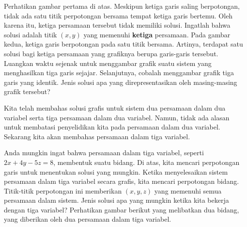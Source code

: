 \begin{center}
\par{}\label{fig:systemsofequationsGeometry-tikz03}%

\end{center}

Perhatikan gambar pertama di atas. Meskipun ketiga garis saling berpotongan, tidak ada satu titik perpotongan bersama
tempat ketiga garis bertemu. Oleh karena itu, ketiga persamaan tersebut tidak memiliki solusi. Ingatlah bahwa solusi adalah titik $\left( x, y \right)$
yang memenuhi \textbf{ketiga} persamaan.
Pada gambar kedua, ketiga garis berpotongan pada satu titik bersama. Artinya, terdapat satu solusi bagi ketiga persamaan yang grafiknya berupa
garis-garis tersebut.
Luangkan waktu sejenak untuk menggambar grafik suatu sistem yang menghasilkan tiga garis sejajar. Selanjutnya, cobalah menggambar grafik tiga garis yang identik. Jenis solusi apa yang direpresentasikan oleh masing-masing grafik tersebut?

Kita telah membahas solusi grafis untuk sistem dua persamaan dalam dua variabel serta tiga persamaan dalam dua variabel. Namun, tidak ada alasan untuk membatasi penyelidikan kita pada persamaan dalam dua variabel. Sekarang kita akan membahas persamaan dalam tiga variabel.

Anda mungkin ingat bahwa persamaan dalam tiga variabel, seperti $2x+4y-5z=8$, membentuk suatu bidang. Di atas, kita mencari perpotongan garis untuk
menentukan solusi yang mungkin. Ketika menyelesaikan sistem persamaan dalam tiga variabel secara grafis, kita mencari
perpotongan bidang. Titik-titik perpotongan ini memberikan $\left( x, y, z \right)$ yang memenuhi semua persamaan
dalam sistem. Jenis solusi apa yang mungkin ketika kita bekerja dengan tiga variabel?
 Perhatikan gambar berikut yang melibatkan dua bidang, yang diberikan oleh dua
persamaan dalam tiga variabel.

